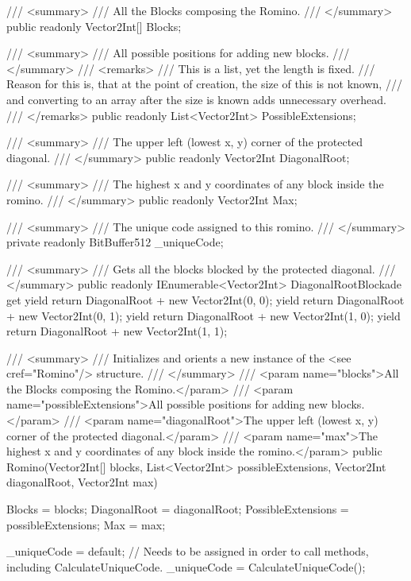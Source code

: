 \documentclass[a4paper,10pt,ngerman]{scrartcl}
\begin{document}
\begin{lstcs}
{    /// <summary>
    /// All the Blocks composing the Romino.
    /// </summary>
    public readonly Vector2Int[] Blocks;

    /// <summary>
    /// All possible positions for adding new blocks.
    /// </summary>
    /// <remarks>
    /// This is a list, yet the length is fixed.
    /// Reason for this is, that at the point of creation, the size of this is not known,
    /// and converting to an array after the size is known adds unnecessary overhead.
    /// </remarks>
    public readonly List<Vector2Int> PossibleExtensions;

    /// <summary>
    /// The upper left (lowest x, y) corner of the protected diagonal.
    /// </summary>
    public readonly Vector2Int DiagonalRoot;

    /// <summary>
    /// The highest x and y coordinates of any block inside the romino.
    /// </summary>
    public readonly Vector2Int Max;

    /// <summary>
    /// The unique code assigned to this romino.
    /// </summary>
    private readonly BitBuffer512 _uniqueCode;

    /// <summary>
    /// Gets all the blocks blocked by the protected diagonal.
    /// </summary>
    public readonly IEnumerable<Vector2Int> DiagonalRootBlockade
    {
        get
        {
            yield return DiagonalRoot + new Vector2Int(0, 0);
            yield return DiagonalRoot + new Vector2Int(0, 1);
            yield return DiagonalRoot + new Vector2Int(1, 0);
            yield return DiagonalRoot + new Vector2Int(1, 1);
        }
    }

    /// <summary>
    /// Initializes and orients a new instance of the <see cref="Romino"/> structure.
    /// </summary>
    /// <param name="blocks">All the Blocks composing the Romino.</param>
    /// <param name="possibleExtensions">All possible positions for adding new blocks.</param>
    /// <param name="diagonalRoot">The upper left (lowest x, y) corner of the protected diagonal.</param>
    /// <param name="max">The highest x and y coordinates of any block inside the romino.</param>
    public Romino(Vector2Int[] blocks, List<Vector2Int> possibleExtensions, Vector2Int diagonalRoot, Vector2Int max)
    {
        Blocks = blocks;
        DiagonalRoot = diagonalRoot;
        PossibleExtensions = possibleExtensions;
        Max = max;

        _uniqueCode = default; // Needs to be assigned in order to call methods, including CalculateUniqueCode.
        _uniqueCode = CalculateUniqueCode();

}}
\end{lstcs}
\end{document}
